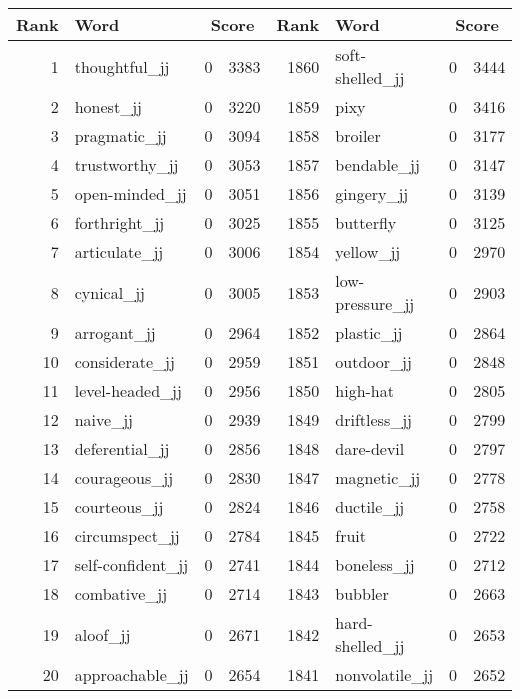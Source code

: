 \begin{table}[tbp]
    \begin{tabular}{| rlr@{.}l | rlr@{.}l |}
    \hline
    \textbf{Rank} & \textbf{Word} & \multicolumn{2}{c|}{\textbf{Score}} & \textbf{Rank} & \textbf{Word} & \multicolumn{2}{c|}{\textbf{Score}} \\
    \hline
    1 & thoughtful\_jj & 0 & 3383    &    1860 & soft-shelled\_jj & 0 & 3444 \\
    2 & honest\_jj & 0 & 3220    &    1859 & pixy & 0 & 3416 \\
    3 & pragmatic\_jj & 0 & 3094    &    1858 & broiler & 0 & 3177 \\
    4 & trustworthy\_jj & 0 & 3053    &    1857 & bendable\_jj & 0 & 3147 \\
    5 & open-minded\_jj & 0 & 3051    &    1856 & gingery\_jj & 0 & 3139 \\
    6 & forthright\_jj & 0 & 3025    &    1855 & butterfly & 0 & 3125 \\
    7 & articulate\_jj & 0 & 3006    &    1854 & yellow\_jj & 0 & 2970 \\
    8 & cynical\_jj & 0 & 3005    &    1853 & low-pressure\_jj & 0 & 2903 \\
    9 & arrogant\_jj & 0 & 2964    &    1852 & plastic\_jj & 0 & 2864 \\
    10 & considerate\_jj & 0 & 2959    &    1851 & outdoor\_jj & 0 & 2848 \\
    11 & level-headed\_jj & 0 & 2956    &    1850 & high-hat & 0 & 2805 \\
    12 & naive\_jj & 0 & 2939    &    1849 & driftless\_jj & 0 & 2799 \\
    13 & deferential\_jj & 0 & 2856    &    1848 & dare-devil & 0 & 2797 \\
    14 & courageous\_jj & 0 & 2830    &    1847 & magnetic\_jj & 0 & 2778 \\
    15 & courteous\_jj & 0 & 2824    &    1846 & ductile\_jj & 0 & 2758 \\
    16 & circumspect\_jj & 0 & 2784    &    1845 & fruit & 0 & 2722 \\
    17 & self-confident\_jj & 0 & 2741    &    1844 & boneless\_jj & 0 & 2712 \\
    18 & combative\_jj & 0 & 2714    &    1843 & bubbler & 0 & 2663 \\
    19 & aloof\_jj & 0 & 2671    &    1842 & hard-shelled\_jj & 0 & 2653 \\
    20 & approachable\_jj & 0 & 2654    &    1841 & nonvolatile\_jj & 0 & 2652 \\

\end{tabular}
\end{table}

